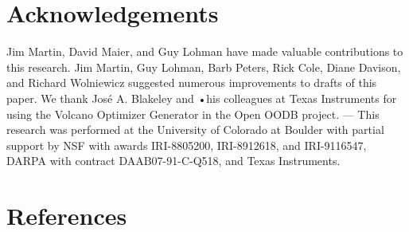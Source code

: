 \documentclass[a4paper,12pt,notitlepage,twoside,openright]{article}
\begin{document}
\hypertarget{acknowledgements}{%
\section{Acknowledgements}\label{acknowledgements}}

Jim Martin, David Maier, and Guy Lohman have made valuable contributions
to this research. Jim Martin, Guy Lohman, Barb Peters, Rick Cole, Diane
Davison, and Richard Wolniewicz suggested numerous improvements to
drafts of this paper. We thank José A. Blakeley and •his colleagues at
Texas Instruments for using the Volcano Optimizer Generator in the Open
OODB project. --- This research was performed at the University of
Colorado at Boulder with partial support by NSF with awards IRI-8805200,
IRI-8912618, and IRI-9116547, DARPA with contract DAAB07-91-C-Q518, and
Texas Instruments.

\hypertarget{references}{%
\section{References}\label{references}}
\end{document}
